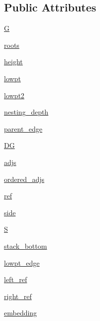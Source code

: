 \subsection*{Public Attributes}
\begin{DoxyCompactItemize}
\item 
\hyperlink{classnetworkx_1_1algorithms_1_1planarity_1_1LRPlanarity_a90e306ef60fabd8ed8e635ccdf016812}{G}
\item 
\hyperlink{classnetworkx_1_1algorithms_1_1planarity_1_1LRPlanarity_a5c79c705e6261cc08f4a19128e76a3e9}{roots}
\item 
\hyperlink{classnetworkx_1_1algorithms_1_1planarity_1_1LRPlanarity_add447ce0f31d3dcfa6d2fb902fe1a02f}{height}
\item 
\hyperlink{classnetworkx_1_1algorithms_1_1planarity_1_1LRPlanarity_aa47e9db93f25eb30d2717633a96ea82c}{lowpt}
\item 
\hyperlink{classnetworkx_1_1algorithms_1_1planarity_1_1LRPlanarity_aaf2fd04fca9639ac6a0343f60a0d39f0}{lowpt2}
\item 
\hyperlink{classnetworkx_1_1algorithms_1_1planarity_1_1LRPlanarity_ab55d0c746bb31396710a46796b568007}{nesting\+\_\+depth}
\item 
\hyperlink{classnetworkx_1_1algorithms_1_1planarity_1_1LRPlanarity_acb43c0265988ccfc0e86e52a636e33bd}{parent\+\_\+edge}
\item 
\hyperlink{classnetworkx_1_1algorithms_1_1planarity_1_1LRPlanarity_a234b821b581dc90ffd28582eb21ada60}{DG}
\item 
\hyperlink{classnetworkx_1_1algorithms_1_1planarity_1_1LRPlanarity_ab3236e565eeb44d01379f24ac986ea37}{adjs}
\item 
\hyperlink{classnetworkx_1_1algorithms_1_1planarity_1_1LRPlanarity_a9d0b1773d12a2e81ede6c3eea51966cb}{ordered\+\_\+adjs}
\item 
\hyperlink{classnetworkx_1_1algorithms_1_1planarity_1_1LRPlanarity_aebe1a566008fded681c3f54bf1ec4ef6}{ref}
\item 
\hyperlink{classnetworkx_1_1algorithms_1_1planarity_1_1LRPlanarity_afc505334eed6650f06e722ddf6275620}{side}
\item 
\hyperlink{classnetworkx_1_1algorithms_1_1planarity_1_1LRPlanarity_a12f75c7a7c4b6911a98eeaf0aab8cbd7}{S}
\item 
\hyperlink{classnetworkx_1_1algorithms_1_1planarity_1_1LRPlanarity_a6e88655d3fde912c63d67cd8a5d4ced4}{stack\+\_\+bottom}
\item 
\hyperlink{classnetworkx_1_1algorithms_1_1planarity_1_1LRPlanarity_aade0ac218c0888986432bac25ce24f0d}{lowpt\+\_\+edge}
\item 
\hyperlink{classnetworkx_1_1algorithms_1_1planarity_1_1LRPlanarity_a352723f06214a1b02ea853ba13469f27}{left\+\_\+ref}
\item 
\hyperlink{classnetworkx_1_1algorithms_1_1planarity_1_1LRPlanarity_a83813a45615d29fe320c1cec03e2b439}{right\+\_\+ref}
\item 
\hyperlink{classnetworkx_1_1algorithms_1_1planarity_1_1LRPlanarity_a590c931757d74e2eb31d0d4c0ad1175e}{embedding}
\end{DoxyCompactItemize}


